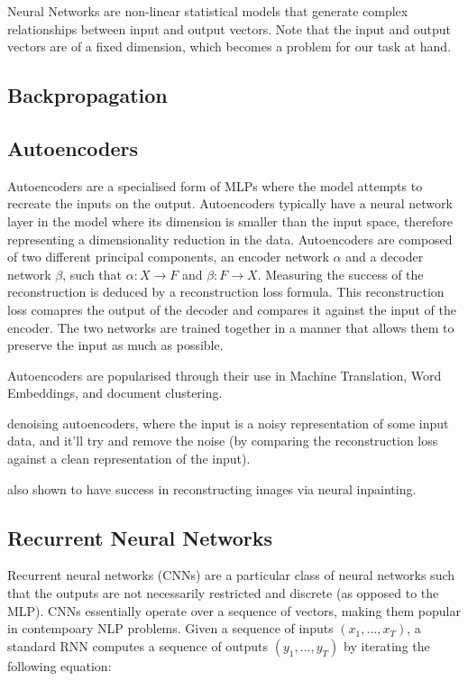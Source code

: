 \documentclass[12pt,twoside]{report}
\begin{document}
Neural Networks are non-linear statistical models that generate complex relationships between input and output vectors. Note that the input and output vectors are of a fixed dimension, which becomes a problem for our task at hand.

\subsection{Backpropagation}

\subsection{Autoencoders}

Autoencoders are a specialised form of MLPs where the model attempts to recreate the inputs on the output. Autoencoders typically have a neural network layer in the model where its dimension is smaller than the input space, therefore representing a dimensionality reduction in the data. Autoencoders are composed of two different principal components, an encoder network $\alpha$ and a decoder network $\beta$, such that $\alpha : X \rightarrow F$ and $\beta : F \rightarrow X$. Measuring the success of the reconstruction is deduced by a reconstruction loss formula. This reconstruction loss comapres the output of the decoder and compares it against the input of the encoder. The two networks are trained together in a manner that allows them to preserve the input as much as possible.


Autoencoders are popularised through their use in Machine Translation, Word Embeddings, and document clustering.


denoising autoencoders, where the input is a noisy representation of some input data, and it'll try and remove the noise (by comparing the reconstruction loss against a clean representation of the input).

also shown to have success in reconstructing images via neural inpainting.

\subsection{Recurrent Neural Networks}

Recurrent neural networks (CNNs) are a particular class of neural networks such that the outputs are not necessarily restricted and discrete (as opposed to the MLP). CNNs essentially operate over a sequence of vectors, making them popular in contempoary NLP problems. Given a sequence of inputs $(x_1, ..., x_T)$, a standard RNN computes a sequence of outputs $(y_1, ..., y_T)$ by iterating the following equation:
\end{document}
